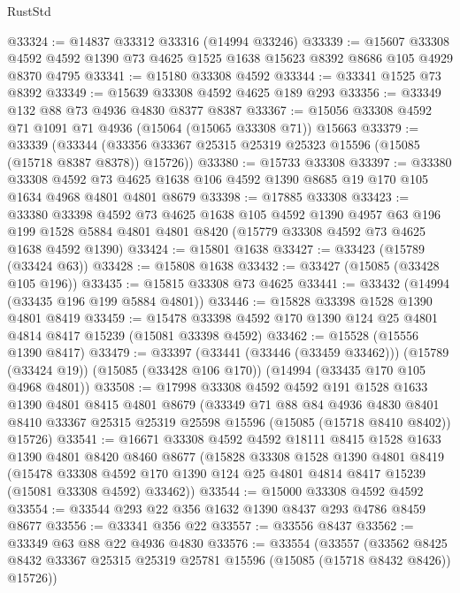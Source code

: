 \begin{lexlean}{RustStd}
\begin{coremodule}
@33324 := @14837 @33312 @33316 (@14994 @33246)
@33339 := @15607
    @33308
    @4592
    @4592
    @1390
    @73
    @4625
    @1525
    @1638
    @15623
    @8392
    @8686
    @105
    @4929
    @8370
    @4795
@33341 := @15180 @33308 @4592
@33344 := @33341 @1525 @73 @8392
@33349 := @15639 @33308 @4592 @4625 @189 @293
@33356 := @33349 @132 @88 @73 @4936 @4830 @8377 @8387
@33367 := @15056 @33308 @4592 @71 @1091 @71 @4936 (@15064 (@15065 @33308 @71)) @15663
@33379 := @33339
    (@33344 (@33356 @33367 @25315 @25319 @25323 @15596 (@15085 (@15718 @8387 @8378)) @15726))
@33380 := @15733 @33308
@33397 := @33380
    @33308
    @4592
    @73
    @4625
    @1638
    @106
    @4592
    @1390
    @8685
    @19
    @170
    @105
    @1634
    @4968
    @4801
    @4801
    @8679
@33398 := @17885 @33308
@33423 := @33380
    @33398
    @4592
    @73
    @4625
    @1638
    @105
    @4592
    @1390
    @4957
    @63
    @196
    @199
    @1528
    @5884
    @4801
    @4801
    @8420
    (@15779 @33308 @4592 @73 @4625 @1638 @4592 @1390)
@33424 := @15801 @1638
@33427 := @33423 (@15789 (@33424 @63))
@33428 := @15808 @1638
@33432 := @33427 (@15085 (@33428 @105 @196))
@33435 := @15815 @33308 @73 @4625
@33441 := @33432 (@14994 (@33435 @196 @199 @5884 @4801))
@33446 := @15828 @33398 @1528 @1390 @4801 @8419
@33459 := @15478 @33398 @4592 @170 @1390 @124 @25 @4801 @4814 @8417 @15239 (@15081 @33398 @4592)
@33462 := @15528 (@15556 @1390 @8417)
@33479 := @33397
    (@33441 (@33446 (@33459 @33462)))
    (@15789 (@33424 @19))
    (@15085 (@33428 @106 @170))
    (@14994 (@33435 @170 @105 @4968 @4801))
@33508 := @17998
    @33308
    @4592
    @4592
    @191
    @1528
    @1633
    @1390
    @4801
    @8415
    @4801
    @8679
    (@33349
      @71
      @88
      @84
      @4936
      @4830
      @8401
      @8410
      @33367
      @25315
      @25319
      @25598
      @15596
      (@15085 (@15718 @8410 @8402))
      @15726)
@33541 := @16671
    @33308
    @4592
    @4592
    @18111
    @8415
    @1528
    @1633
    @1390
    @4801
    @8420
    @8460
    @8677
    (@15828
      @33308
      @1528
      @1390
      @4801
      @8419
      (@15478
        @33308
        @4592
        @170
        @1390
        @124
        @25
        @4801
        @4814
        @8417
        @15239
        (@15081 @33308 @4592)
        @33462))
@33544 := @15000 @33308 @4592 @4592
@33554 := @33544 @293 @22 @356 @1632 @1390 @8437 @293 @4786 @8459 @8677
@33556 := @33341 @356 @22
@33557 := @33556 @8437
@33562 := @33349 @63 @88 @22 @4936 @4830
@33576 := @33554
    (@33557
      (@33562 @8425 @8432 @33367 @25315 @25319 @25781 @15596 (@15085 (@15718 @8432 @8426)) @15726))

\end{coremodule}
\end{lexlean}
